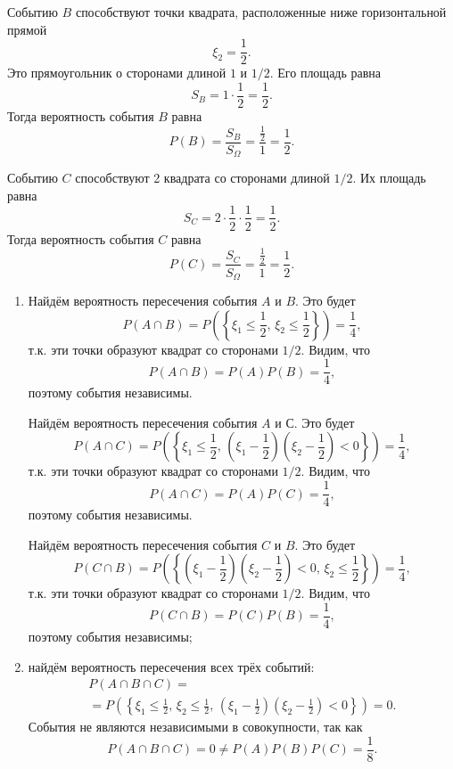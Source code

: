 Событию $B$ способствуют точки квадрата, расположенные ниже горизонтальной прямой
$$ \xi_2 = \frac{1}{2}.$$
Это прямоугольник о сторонами длиной $1$ и $1/2$.
Его площадь равна
$$S_B =
1 \cdot \frac{1}{2} =
\frac{1}{2}.$$
Тогда вероятность события $B$ равна
$$P \left( B \right) =
\frac{S_B}{S_{ \Omega }} =
\frac{ \frac{1}{2} }{1} =
\frac{1}{2}.$$

Событию $C$ способствуют 2 квадрата со сторонами длиной $1/2$.
Их площадь равна
$$S_C =
2 \cdot \frac{1}{2} \cdot \frac{1}{2} =
\frac{1}{2}.$$
Тогда вероятность события $C$ равна
$$P \left( C \right) =
\frac{S_C}{S_{ \Omega }} =
\frac{ \frac{1}{2} }{1} =
\frac{1}{2}.$$

\begin{enumerate}[label=\alph*)]
\item Найдём вероятность пересечения события $A$ и $B$.
Это будет
$$P \left( A \cap B \right) =
P \left( \left\{ \xi_1 \leq \frac{1}{2}, \, \xi_2 \leq \frac{1}{2} \right\} \right) =
\frac{1}{4},$$
т.к. эти точки образуют квадрат со сторонами $1/2$.
Видим, что
$$P \left( A \cap B \right) =
P \left( A \right) P \left( B \right) =
\frac{1}{4},$$
поэтому события независимы.

Найдём вероятность пересечения события $A$ и $С$.
Это будет
$$P \left( A \cap C \right) =
P \left( \left\{ \xi_1 \leq \frac{1}{2}, \, \left( \xi_1 - \frac{1}{2} \right) \left( \xi_2 - \frac{1}{2} \right) < 0 \right\} \right) =
\frac{1}{4},$$
т.к. эти точки образуют квадрат со сторонами $1/2$.
Видим, что
$$P \left( A \cap C \right) =
P \left( A \right) P \left( C \right) =
\frac{1}{4},$$
поэтому события независимы.

Найдём вероятность пересечения события $C$ и $B$.
Это будет
$$P \left( C \cap B \right) =
P \left( \left\{ \left( \xi_1 - \frac{1}{2} \right) \left( \xi_2 - \frac{1}{2} \right) < 0, \, \xi_2 \leq \frac{1}{2} \right\} \right) =
\frac{1}{4},$$
т.к. эти точки образуют квадрат со сторонами $1/2$.
Видим, что
$$P \left( C \cap B \right) =
P \left( C \right) P \left( B \right) =
\frac{1}{4},$$
поэтому события независимы;
\item найдём вероятность пересечения всех трёх событий:
\begin{equation*}
\begin{split}
P \left( A \cap B \cap C \right) = \\
= P \left( \left\{ \xi_1 \leq \frac{1}{2}, \,
\xi_2 \leq \frac{1}{2}, \,
\left( \xi_1 - \frac{1}{2} \right) \left( \xi_2 - \frac{1}{2} \right) < 0\right\} \right) =
0.
\end{split}
\end{equation*}
События не являются независимыми в совокупности, так как
$$P \left( A \cap B \cap C \right) =
0 \neq
P \left( A \right) P \left( B \right) P \left( C \right) =
\frac{1}{8}.$$
\end{enumerate}

